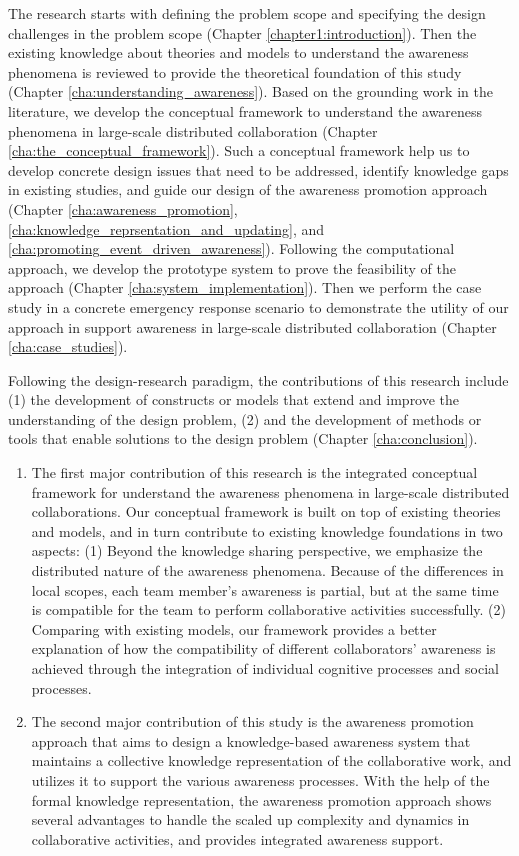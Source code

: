 The research starts with defining the problem scope and specifying the design challenges in the problem scope (Chapter \ref{chapter1:introduction}). Then the existing knowledge about theories and models to understand the awareness phenomena is reviewed to provide the theoretical foundation of this study (Chapter \ref{cha:understanding_awareness}). Based on the grounding work in the literature, we develop the conceptual framework to understand the awareness phenomena in large-scale distributed collaboration (Chapter \ref{cha:the_conceptual_framework}). Such a conceptual framework help us to develop concrete design issues that need to be addressed, identify knowledge gaps in existing studies, and guide our design of the awareness promotion approach (Chapter \ref{cha:awareness_promotion}, \ref{cha:knowledge_reprsentation_and_updating}, and \ref{cha:promoting_event_driven_awareness}). Following the computational approach, we develop the prototype system to prove the feasibility of the approach (Chapter \ref{cha:system_implementation}). Then we perform the case study in a concrete emergency response scenario to demonstrate the utility of our approach in support awareness in large-scale distributed collaboration (Chapter \ref{cha:case_studies}). 

Following the design-research paradigm, the contributions of this research include (1) the development of constructs or models that extend and improve the understanding of the design problem, (2) and the development of methods or tools that enable solutions to the design problem (Chapter \ref{cha:conclusion}).

\begin{enumerate}
	\item The first major contribution of this research is the integrated conceptual framework for understand the awareness phenomena in large-scale distributed collaborations. Our conceptual framework is built on top of existing theories and models, and in turn contribute to existing knowledge foundations in two aspects: (1) Beyond the knowledge sharing perspective, we emphasize the distributed nature of the awareness phenomena. Because of the differences in local scopes, each team member’s awareness is partial, but at the same time is compatible for the team to perform collaborative activities successfully. (2) Comparing with existing models, our framework provides a better explanation of how the compatibility of different collaborators’ awareness is achieved through the integration of individual cognitive processes and social processes.
	\item The second major contribution of this study is the awareness promotion approach that aims to design a knowledge-based awareness system that maintains a collective knowledge representation of the collaborative work, and utilizes it to support the various awareness processes. With the help of the formal knowledge representation, the awareness promotion approach shows several advantages to handle the scaled up complexity and dynamics in collaborative activities, and provides integrated awareness support.
\end{enumerate}
